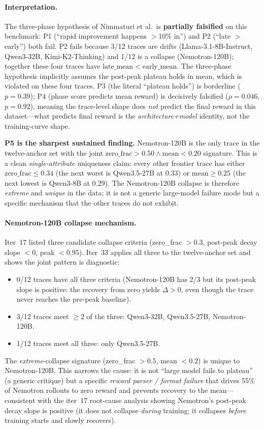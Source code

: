 \documentclass{article}
\begin{document}
\paragraph{Interpretation.}
The three-phase hypothesis of Nimmaturi et al.~is \textbf{partially
falsified} on this benchmark: P1 (``rapid improvement happens
$>$10\% in'') and P2 (``late $>$ early'') both fail. P2 fails because
3/12 traces are drifts (Llama-3.1-8B-Instruct, Qwen3-32B,
Kimi-K2-Thinking) and 1/12 is a collapse (Nemotron-120B); together
these four traces have $\mathrm{late\_mean} < \mathrm{early\_mean}$.
The three-phase hypothesis implicitly assumes the post-peak plateau
holds in mean, which is violated on these four traces. P3 (the literal
``plateau holds'') is borderline ($p=0.39$); P4 (phase score predicts
mean reward) is decisively falsified ($\rho = 0.046$, $p = 0.92$),
meaning the trace-level shape does \emph{not} predict the final reward
in this dataset---what predicts final reward is the
\emph{architecture+model} identity, not the training-curve shape.

\textbf{P5 is the sharpest sustained finding.} Nemotron-120B is the
only trace in the twelve-anchor set with the joint
$\mathrm{zero\_frac} > 0.50 \wedge \mathrm{mean} < 0.20$ signature.
This is a clean \emph{single-attribute} uniqueness claim: every other
frontier trace has either $\mathrm{zero\_frac} \le 0.34$ (the next
worst is Qwen3.5-27B at 0.33) or $\mathrm{mean} \ge 0.25$ (the next
lowest is Qwen3-8B at 0.29). The Nemotron-120B collapse is therefore
\emph{extreme} and \emph{unique} in the data; it is not a generic
large-model failure mode but a specific mechanism that the other
traces do not exhibit.

\paragraph{Nemotron-120B collapse mechanism.}
Iter~17 listed three candidate collapse criteria (zero\_frac $> 0.3$,
post-peak decay slope $< 0$, peak $< 0.95$). Iter~33 applies all three
to the twelve-anchor set and shows the joint pattern is
diagnostic:
\begin{itemize}
\item 0/12 traces have all three criteria (Nemotron-120B has 2/3 but
  its post-peak slope is positive: the recovery from zero yields
  $\Delta > 0$, even though the trace never reaches the pre-peak
  baseline).
\item 3/12 traces meet $\ge 2$ of the three: Qwen3-32B, Qwen3.5-27B,
  Nemotron-120B.
\item 1/12 traces meet all three: only Qwen3.5-27B.
\end{itemize}
The \emph{extreme}-collapse signature (zero\_frac $> 0.5$, mean $< 0.2$)
is unique to Nemotron-120B. This narrows the cause: it is not
``large model fails to plateau'' (a generic critique) but a specific
\emph{reward parser / format failure} that drives 55\% of Nemotron
rollouts to zero reward and prevents recovery to the mean---consistent
with the iter~17 root-cause analysis showing Nemotron's
post-peak decay slope is positive (it does not collapse
\emph{during} training; it collapses \emph{before} training starts and
slowly recovers).
\end{document}
